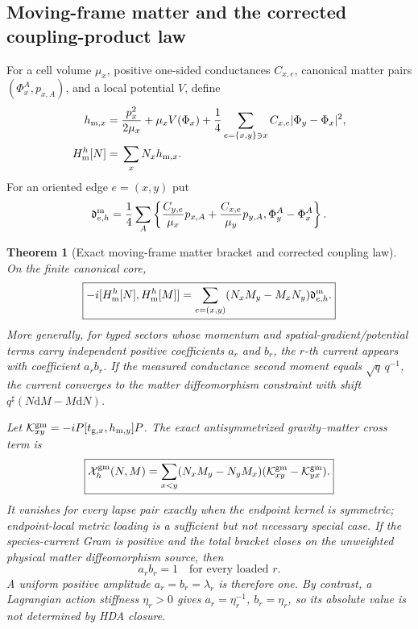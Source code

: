 \documentclass[11pt]{article}
\newtheorem{theorem}{Theorem}[section]
\theoremstyle{definition}
\theoremstyle{remark}
\newcommand{\dd}{\mathrm d}
\begin{document}
\subsection{Moving-frame matter and the corrected coupling-product law}

For a cell volume $\mu_x$, positive one-sided conductances $C_{x,e}$, canonical
matter pairs $(\Phi_x^A,p_{x,A})$, and a local potential $V$, define
\[
 \begin{aligned}
 h_{{\rm m},x}={}&\frac{p_x^2}{2\mu_x}+\mu_xV(\Phi_x)
 +\frac14\sum_{e=\{x,y\}\ni x}C_{x,e}|\Phi_y-\Phi_x|^2,\\
 H_{\rm m}^h[N]={}&\sum_xN_xh_{{\rm m},x}.
 \end{aligned}
\]
For an oriented edge $e=(x,y)$ put
\[
 \mathfrak d_{e,h}^{\rm m}
 =\frac14\sum_A
 \left\{
 \frac{C_{y,e}}{\mu_x}p_{x,A}
 +\frac{C_{x,e}}{\mu_y}p_{y,A},
 \Phi_y^A-\Phi_x^A
 \right\}.
\]

\begin{theorem}[Exact moving-frame matter bracket and corrected coupling law]
\label{thm:moving-frame-matter-master}
On the finite canonical core,
\[
 \boxed{
 -i[H_{\rm m}^h[N],H_{\rm m}^h[M]]
 =\sum_{e=(x,y)}(N_xM_y-M_xN_y)\mathfrak d_{e,h}^{\rm m}.}
\]
More generally, for typed sectors whose momentum and
spatial-gradient/potential terms carry independent positive coefficients
\(a_r\) and \(b_r\), the \(r\)-th current appears with coefficient \(a_rb_r\).
If the measured conductance second moment equals \(\sqrt q\,q^{-1}\), the
current converges to the matter diffeomorphism constraint with shift
\(q^\sharp(N\dd M-M\dd N)\).

Let \(\mathcal K_{xy}^{\rm gm}=-iP[t_{{\rm g},x},h_{{\rm m},y}]P\).  The exact
antisymmetrized gravity--matter cross term is
\[
 \boxed{
 \mathcal X_h^{\rm gm}(N,M)
 =\sum_{x<y}(N_xM_y-N_yM_x)
  (\mathcal K_{xy}^{\rm gm}-\mathcal K_{yx}^{\rm gm}).}
\]
It vanishes for every lapse pair exactly when the endpoint kernel is symmetric;
endpoint-local metric loading is a sufficient but not necessary special case.
If the species-current Gram is positive and the total bracket closes on the
unweighted physical matter diffeomorphism source, then
\[
 \boxed{a_rb_r=1\quad\text{for every loaded }r.}
\]
A uniform positive amplitude \(a_r=b_r=\lambda_r\) is therefore one.  By
contrast, a Lagrangian action stiffness \(\eta_r>0\) gives
\(a_r=\eta_r^{-1}\), \(b_r=\eta_r\), so its absolute value is not determined
by HDA closure.
\end{theorem}
\end{document}
